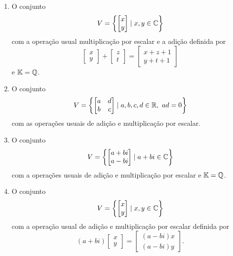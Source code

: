 \documentclass[12pt]{exam}
\begin{document}
\begin{exercicio}
\begin{enumerate}[label={\alph*)}]
    \item O conjunto
      \[
         V = \left\{\begin{bmatrix}x\\y \end{bmatrix} \mid x, y \in \mathbb{C}\right\}
      \]
      com a operação usual multiplicação por escalar e a adição definida por
      \[
        \begin{bmatrix}x\\y\end{bmatrix} + \begin{bmatrix} z\\t\end{bmatrix} = \begin{bmatrix}x + z + 1\\y + t + 1\end{bmatrix}
      \]
      e $\mathbb{K} = \mathbb{Q}$.
    
    \item O conjunto
      \[
        V = \left\{\begin{bmatrix}a & d\\b & c \end{bmatrix} \mid a, b, c, d \in \mathbb{R},\ ad = 0 \right\}
      \]
      com as operações usuais de adição e multiplicação por escalar.
    
    \item O conjunto
      \[
         V = \left\{\begin{bmatrix}a + bi\\a - bi \end{bmatrix} \mid a + bi \in \mathbb{C}\right\}
      \]
      com a operações usuais de adição e multiplicação por escalar e $\mathbb{K} = \mathbb{Q}$.

    \item O conjunto
      \[
         V = \left\{\begin{bmatrix}x\\y \end{bmatrix} \mid x, y \in \mathbb{C}\right\}
      \]
      com a operação usual de adição e multiplicação por escalar definida por
      \[
        (a + bi)\begin{bmatrix}x\\y\end{bmatrix} = \begin{bmatrix}(a - bi)x\\(a - bi)y\end{bmatrix}.
      \]


  \end{enumerate}
\end{exercicio}
\end{document}
